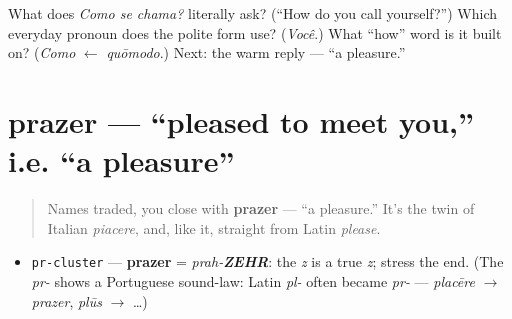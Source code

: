 \begin{tcolorbox}[breakable,colback=teal!4,colframe=teal!35!black,title={Before you move on}]
What does \emph{Como se chama?} literally ask? (\textquotedblleft{}How do you call yourself?\textquotedblright{}) Which everyday pronoun does the polite form use? (\emph{Você}.) What \textquotedblleft{}how\textquotedblright{} word is it built on? (\emph{Como} $\leftarrow$ \emph{quōmodo}.) Next: the warm reply — \textquotedblleft{}a pleasure.\textquotedblright{}
\end{tcolorbox}
\section[prazer]{prazer — \textquotedblleft{}pleased to meet you,\textquotedblright{} i.e. \textquotedblleft{}a pleasure\textquotedblright{}}

\label{lesson:PT-C03-prazer}



\begin{quote}
Names traded, you close with \textbf{prazer} — \textquotedblleft{}a pleasure.\textquotedblright{} It's the twin of Italian \emph{piacere}, and, like it, straight from Latin \emph{please}.
\end{quote}

\begin{sounds}
\begin{itemize}
\raggedright
  \item \texttt{pr-cluster} — \textbf{prazer} = \emph{prah-\textbf{ZEHR}}: the \emph{z} is a true \emph{z}; stress the end. (The \emph{pr-} shows a Portuguese sound-law: Latin \emph{pl-} often became \emph{pr-} — \emph{placēre} $\to$ \emph{prazer}, \emph{plūs} $\to$ …)
\end{itemize}
\end{sounds}

